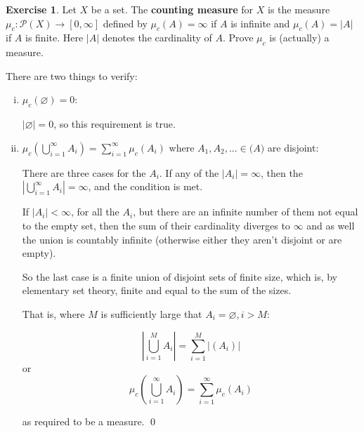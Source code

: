 \documentclass[11pt,oneside]{article}
\numberwithin{equation}{section}
\theoremstyle{definition}
\newtheorem{exercise}{Exercise}
\begin{document}
\begin{exercise}
  Let $X$ be a set.  The \textbf{counting measure} for $X$ is the
  measure $\mu _c: \mathcal{P}(X) \to [0, \infty]$ defined
  by $\mu_c(A) = \infty$ if $A$ is infinite and $\mu_c (A) = | A | $ if
  $A$ is finite. Here $|A|$ denotes the cardinality of $A$.
  Prove $\mu _c$ is (actually) a measure.
\end{exercise}
\begin{solution}
  There are two things to verify:
  \begin{enumerate}[(i)]
    \item
      $\mu_c ( \varnothing ) = 0$: 

      $  | \varnothing | = 0$, so this requirement is true.
    \item
      $ \mu _c ( \bigcup \limits_{i=1} ^{\infty} A_i )= \sum \limits _{i=1} ^ \infty \mu_c (A _i)$
      where $A_1, A_2, ... \in \mathcal(A)$ are disjoint:

      There are three cases for the $A_i$.  If any of
      the $|A_i| = \infty$, then
      the $| \bigcup \limits_{i=1} ^ \infty A_i | = \infty$, and the condition is met.
      
      If $|A_i| < \infty$, for all the $A_i$, but there are an
      infinite number of them not equal to the empty set, then the sum
      of their cardinality diverges to $\infty$ and as well the union
      is countably infinite (otherwise either they aren't disjoint or are empty).

      So the last case is a finite union of disjoint sets of finite size, which
      is, by elementary set theory, finite and equal to the sum of the sizes. 

      That is, where $ M$ is sufficiently large that $A_i = \varnothing, i > M $:

      $$
      | \bigcup \limits _ {i=1} ^ M A_i | = \sum \limits _ { i=1} ^ M | (A_i) |
      $$
      or 
      $$
      \mu_c ( \bigcup \limits _ {i=1} ^ \infty A_i ) = \sum \limits _ { i=1} ^ \infty \mu_c (A_i) 
      $$

      as required to be a measure.  \qed
      
  \end{enumerate}
\end{solution}
\end{document}
